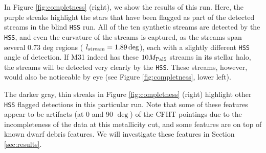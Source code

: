 \documentclass[twocolumn]{aastex631}
\begin{document}
In Figure \ref{fig:completness} (right), we show the results of this run. Here, the purple streaks highlight the stars that have been flagged as part of the detected streams in the blind \texttt{HSS} run. All of the ten synthetic streams are detected by the \texttt{HSS}, and even the curvature of the streams is captured, as the streams span several 0.73 deg regions ( $l_{\rm stream}= 1.89 \deg$), each with a slightly different \texttt{HSS} angle of detection. If M31 indeed has these $10{M}_{\rm Pal 5}$ streams in its stellar halo, the streams will be detected very clearly by the \texttt{HSS}. These streams, however, would also be noticeable by eye (see Figure \ref{fig:completness}, lower left). 

The darker gray, thin streaks in Figure \ref{fig:completness} (right) highlight other \texttt{HSS} flagged detections in this particular run. Note that some of these features appear to be artifacts (at 0 and 90 $\deg$) of the CFHT pointings due to the incompleteness of the data at this metallicity cut, and some features are on top of known dwarf debris features. We will investigate these features in Section \ref{sec:results}. 
\end{document}
